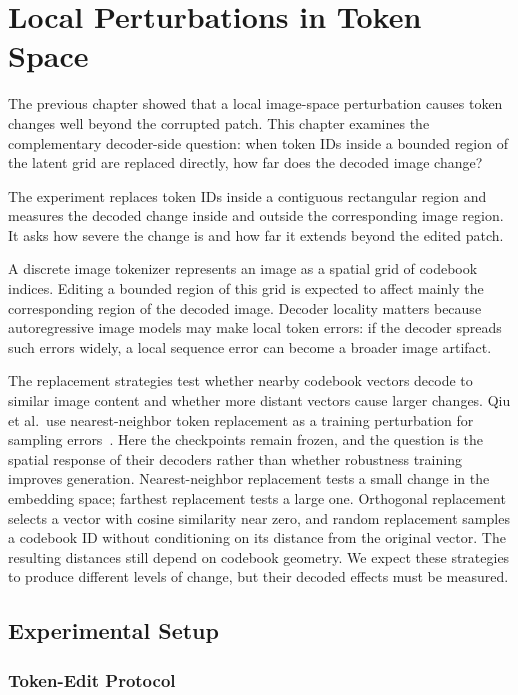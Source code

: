 \chapter{Local Perturbations in Token Space}
\label{ch:rq4}

The previous chapter showed that a local image-space perturbation causes token changes well beyond the corrupted patch. This chapter examines the complementary decoder-side question: when token IDs inside a bounded region of the latent grid are replaced directly, how far does the decoded image change?

The experiment replaces token IDs inside a contiguous rectangular region and
measures the decoded change inside and outside the corresponding image region.
It asks how severe the change is and how far it extends beyond the edited patch.

A discrete image tokenizer represents an image as a spatial grid of codebook
indices. Editing a bounded region of this grid is expected to affect mainly
the corresponding region of the decoded image. Decoder locality matters because
autoregressive image models may make local token errors: if the decoder spreads
such errors widely, a local sequence error can become a broader image artifact.

The replacement strategies test whether nearby codebook vectors decode to
similar image content and whether more distant vectors cause larger changes.
Qiu et al.\ use nearest-neighbor token replacement as a training perturbation
for sampling errors~\cite{qiu2025imagetokenizer}. Here the checkpoints remain
frozen, and the question is the spatial response of their decoders rather
than whether robustness training improves generation.
Nearest-neighbor replacement tests a small change in the embedding space;
farthest replacement tests a large one. Orthogonal replacement selects a
vector with cosine similarity near zero, and random replacement samples a
codebook ID without conditioning on its distance from the original vector.
The resulting distances still depend on codebook geometry. We expect these
strategies to produce different levels of change, but their decoded effects
must be measured.

\section{Experimental Setup}
\label{sec:rq4_setup}

\subsection{Token-Edit Protocol}
\label{subsec:rq4_token_edit_protocol}

